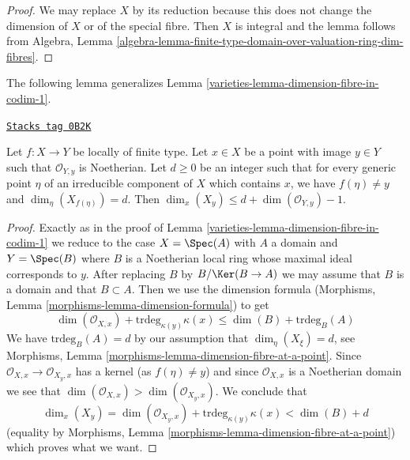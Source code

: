 \begin{proof}
We may replace $X$ by its reduction because this does not change the
dimension of $X$ or of the special fibre. Then $X$ is integral and
the lemma follows from Algebra, Lemma
\ref{algebra-lemma-finite-type-domain-over-valuation-ring-dim-fibres}.
\end{proof}

The following lemma generalizes Lemma \ref{varieties-lemma-dimension-fibre-in-codim-1}.

\begin{lemma}
\label{varieties-lemma-dimension-fibre-in-higher-codimension}
\href{https://stacks.math.columbia.edu/tag/0B2K}{\texttt{Stacks tag 0B2K}}

Let $f : X \to Y$ be locally of finite type. Let $x \in X$ be a point
with image $y \in Y$ such that $\mathcal{O}_{Y, y}$ is Noetherian. Let
$d \geq 0$ be an integer such that for every generic point $\eta$ of an
irreducible component of $X$ which contains $x$, we have
$f(\eta) \not = y$ and $\dim_\eta(X_{f(\eta)}) = d$. Then
$\dim_x(X_y) \leq d + \dim(\mathcal{O}_{Y, y}) - 1$.
\end{lemma}

\begin{proof}

Exactly as in the proof of Lemma \ref{varieties-lemma-dimension-fibre-in-codim-1}
we reduce to the case $X = \Spec(A)$ with $A$ a domain and $Y = \Spec(B)$
where $B$ is a Noetherian local ring whose maximal ideal corresponds to $y$.
After replacing $B$ by $B/\Ker(B \to A)$ we may assume that $B$
is a domain and that $B \subset A$.
Then we use the dimension formula
(Morphisms, Lemma \ref{morphisms-lemma-dimension-formula}) to get
$$
\dim(\mathcal{O}_{X, x}) + \text{trdeg}_{\kappa(y)} \kappa(x) \leq
\dim(B) + \text{trdeg}_B(A)
$$
We have $\text{trdeg}_B(A) = d$ by
our assumption that $\dim_\eta(X_\xi) = d$, see
Morphisms, Lemma \ref{morphisms-lemma-dimension-fibre-at-a-point}.
Since $\mathcal{O}_{X, x} \to \mathcal{O}_{X_y, x}$ has a kernel
(as $f(\eta) \not = y$) and since $\mathcal{O}_{X, x}$
is a Noetherian domain we see that
$\dim(\mathcal{O}_{X, x}) > \dim(\mathcal{O}_{X_y, x})$.
We conclude that
$$
\dim_x(X_y) =
\dim(\mathcal{O}_{X_y, x}) + \text{trdeg}_{\kappa(y)} \kappa(x)
< \dim(B) + d
$$
(equality by Morphisms, Lemma \ref{morphisms-lemma-dimension-fibre-at-a-point})
which proves what we want.
\end{proof}

